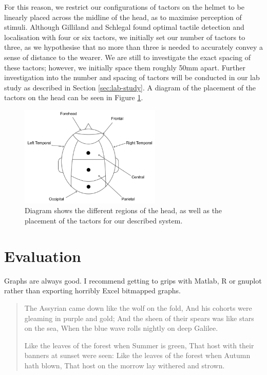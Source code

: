 \documentclass{mpaper}
\begin{document}
For this reason, we restrict our configurations of tactors on the helmet to be linearly placed across the midline of the head, as to maximise perception of stimuli. Although Gilliland and Schlegal \cite{doi:10.1177/001872089403600410} found optimal tactile detection and localisation with four or six tactors, we initially set our number of tactors to three, as we hypothesise that no more than three is needed to accurately convey a sense of distance to the wearer. We are still to investigate the exact spacing of these tactors; however, we initially space them roughly 50mm apart. Further investigation into the number and spacing of tactors will be conducted in our lab study as described in Section \ref{sec:lab-study}. A diagram of the placement of the tactors on the head can be seen in Figure \ref{fig:head-regions}.

\begin{figure}[ht]
    \centering
    \includegraphics[width=0.60\textwidth]{images/head-regions.pdf}
    \caption{Diagram shows the different regions of the head, as well as the placement of the tactors for our described system.}
    \label{fig:head-regions}
\end{figure}

\section{Evaluation}

Graphs are always good. I recommend getting to grips with Matlab, R or
gnuplot rather than exporting horribly Excel bitmapped graphs.


\begin{quotation}
 The Assyrian came down like the wolf on the fold,
 And his cohorts were gleaming in purple and gold;
 And the sheen of their spears was like stars on the sea,
 When the blue wave rolls nightly on deep Galilee.

 Like the leaves of the forest when Summer is green,
 That host with their banners at sunset were seen:
 Like the leaves of the forest when Autumn hath blown,
 That host on the morrow lay withered and strown.
\end{quotation}
\end{document}
